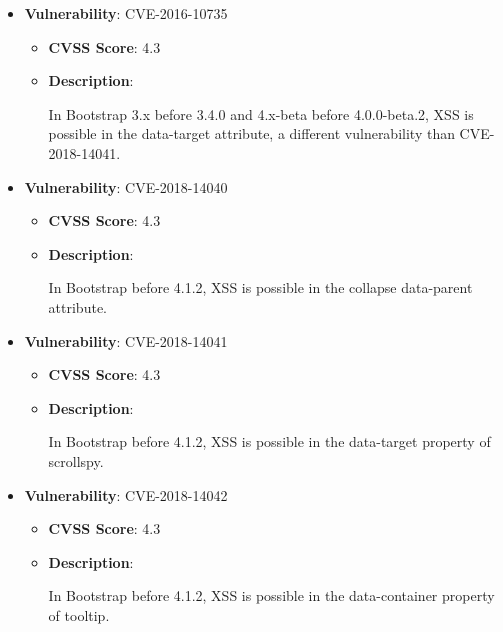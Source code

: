 \documentclass{article}
\begin{document}
\begin{itemize}
    
        \item \textbf{Vulnerability}: CVE-2016-10735
        \begin{itemize}
            \item \textbf{CVSS Score}:  4.3 
            \item \textbf{Description}:
            \parbox[t]{0.9\linewidth}{
                \ttfamily In Bootstrap 3.x before 3.4.0 and 4.x-beta before 4.0.0-beta.2, XSS is possible in the data-target attribute, a different vulnerability than CVE-2018-14041.
            }
        \end{itemize}
    
        \item \textbf{Vulnerability}: CVE-2018-14040
        \begin{itemize}
            \item \textbf{CVSS Score}:  4.3 
            \item \textbf{Description}:
            \parbox[t]{0.9\linewidth}{
                \ttfamily In Bootstrap before 4.1.2, XSS is possible in the collapse data-parent attribute.
            }
        \end{itemize}
    
        \item \textbf{Vulnerability}: CVE-2018-14041
        \begin{itemize}
            \item \textbf{CVSS Score}:  4.3 
            \item \textbf{Description}:
            \parbox[t]{0.9\linewidth}{
                \ttfamily In Bootstrap before 4.1.2, XSS is possible in the data-target property of scrollspy.
            }
        \end{itemize}
    
        \item \textbf{Vulnerability}: CVE-2018-14042
        \begin{itemize}
            \item \textbf{CVSS Score}:  4.3 
            \item \textbf{Description}:
            \parbox[t]{0.9\linewidth}{
                \ttfamily In Bootstrap before 4.1.2, XSS is possible in the data-container property of tooltip.
            }
        \end{itemize}
    
\end{itemize}
\end{document}

